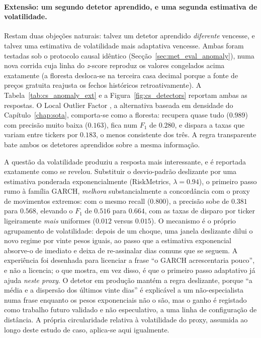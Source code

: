 \paragraph{Extensão: um segundo detetor aprendido, e uma segunda estimativa de volatilidade.}
Restam duas objeções naturais: talvez um detetor aprendido \emph{diferente} vencesse, e talvez uma estimativa
de volatilidade mais adaptativa vencesse. Ambas foram testadas sob o protocolo causal idêntico
(Secção~\ref{sec:met_eval_anomaly}), numa nova corrida cuja linha do \emph{z}-score reproduz os valores
congelados acima exatamente (a floresta desloca-se na terceira casa decimal porque a fonte de preços gratuita
reajusta os fechos históricos retroativamente). A Tabela~\ref{tab:cs_anomaly_ext} e a
Figura~\ref{fig:cs_detectors} reportam ambas as respostas. O Local Outlier Factor \autocite{breunig2000lof}, a
alternativa baseada em densidade do Capítulo~\ref{chap:sota}, comporta-se como a floresta: recupera quase tudo
($0.989$) com precisão muito baixa ($0.163$), fica num $F_1$ de $0.280$, e dispara a taxas que variam entre
tickers por $0.183$, o menos consistente dos três. A regra transparente bate ambos os detetores aprendidos
sobre a mesma informação.

A questão da volatilidade produziu a resposta mais interessante, e é reportada exatamente como se revelou.
Substituir o desvio-padrão deslizante por uma estimativa ponderada exponencialmente (RiskMetrics,
$\lambda = 0.94$), o primeiro passo rumo à família GARCH, \emph{melhora} substancialmente a concordância com o
proxy de movimentos extremos: com o mesmo recall ($0.800$), a precisão sobe de $0.381$ para $0.568$, elevando
o $F_1$ de $0.516$ para $0.664$, com as taxas de disparo por ticker ligeiramente \emph{mais} uniformes
($0.012$ versus $0.015$). O mecanismo é o próprio agrupamento de volatilidade: depois de um choque, uma janela
deslizante dilui o novo regime por vinte pesos iguais, ao passo que a estimativa exponencial absorve-o de
imediato e deixa de re-assinalar dias comuns que se seguem. A experiência foi desenhada para licenciar a frase
``o GARCH acrescentaria pouco'', e não a licencia; o que mostra, em vez disso, é que o primeiro passo
adaptativo já ajuda \emph{neste proxy}. O detetor em produção mantém a regra deslizante, porque ``a média e a
dispersão dos últimos vinte dias'' é explicável a um não-especialista numa frase enquanto os pesos
exponenciais não o são, mas o ganho é registado como trabalho futuro validado e não especulativo, a uma linha
de configuração de distância. A própria circularidade relativa à volatilidade do proxy, assumida ao longo
deste estudo de caso, aplica-se aqui igualmente.

